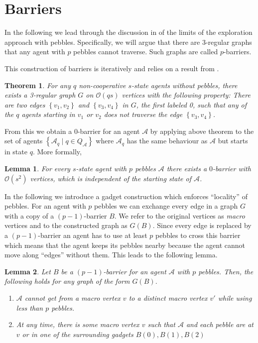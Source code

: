 \documentclass[oneside]{scrartcl}
\newtheorem{thm}{Theorem}
\newtheorem{lem}{Lemma}
\begin{document}
\section{Barriers}
In the following we lead through the discussion in \cite{pebbles} of the limits
of the exploration approach with pebbles. Specifically, we will argue that
there are 3-regular graphs that any agent with $p$ pebbles cannot traverse.
Such graphs are called $p$-barriers.

This construction of barriers is iteratively and relies on a result from
\cite{0barrier}.
\begin{thm}
  For any $q$ non-cooperative $s$-state agents without pebbles, there exists
  a 3-regular graph $G$ on $\mathcal{O}(qs)$ vertices with the following
  property: There are two edges $\left\{v_1,v_2\right\}$ and
  $\left\{v_3,v_4\right\}$ in $G$, the first labeled 0, such that any of the
  $q$ agents starting in $v_1$ or $v_2$ does not traverse the edge
  $\left\{v_3,v_4\right\}$.
\end{thm}
From this we obtain a $0$-barrier for an agent $\mathcal{A}$ by applying
above theorem to the set of agents
$\left\{\mathcal{A}_{q}\mid q\in Q_{\mathcal{A}}\right\}$ where
$\mathcal{A}_{q}$ has the same behaviour as $\mathcal{A}$ but starts in
state $q$. More formally,
\begin{lem}
  \label{lem:0bar}
  For every $s$-state agent with $p$ pebbles $\mathcal{A}$ there exists a
  $0$-barrier with $\mathcal{O}(s^{2})$ vertices, which is independent of
  the starting state of $\mathcal{A}$.
\end{lem}

In the following we introduce a gadget construction which enforces
\enquote{locality} of pebbles. For an agent with $p$ pebbles we can exchange
every edge in a graph $G$ with a copy of a $(p-1)$-barrier $B$. We refer to the
original vertices as \emph{macro} vertices and to the constructed graph as
$G(B)$.  Since every edge is replaced by a $(p-1)$-barrier an agent has to use
at least $p$ pebbles to cross this barrier which means that the agent keeps its
pebbles nearby because the agent cannot move along \enquote{edges} without
them.  This leads to the following lemma.
\begin{lem}
  \label{lem:loc}
  Let $B$ be a $(p-1)$-barrier for an agent $\mathcal{A}$ with $p$ pebbles.
  Then, the following holds for any graph of the form $G(B)$.
  \begin{enumerate}
    \item $\mathcal{A}$ cannot get from a macro vertex $v$ to a distinct
      macro vertex $v'$ while using less than $p$ pebbles.
    \item At any time, there is some macro vertex $v$ such that $\mathcal{A}$
      and each pebble are at $v$ or in one of the surrounding gadgets $B(0),
      B(1), B(2)$
  \end{enumerate}
\end{lem}
\end{document}
